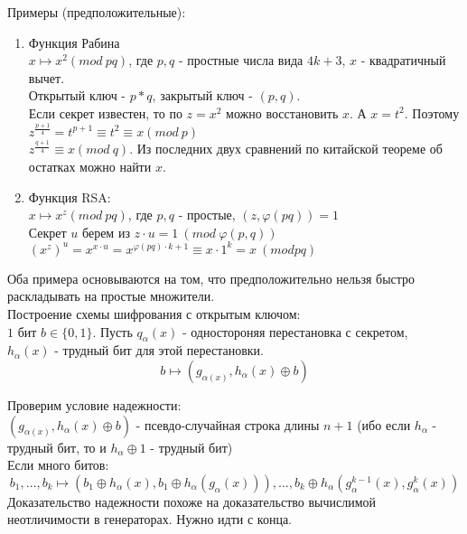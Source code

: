 \documentclass[a4paper]{article}
\theoremstyle{definition}
\theoremstyle{plain}
\begin{document}
\noindent Примеры (предположительные):
\begin{enumerate}
	\item Функция Рабина~\\
		$x \mapsto x^2 (mod\ pq)$, где $p, q$ - простные числа вида $4k + 3$, $x$ - квадратичный вычет.~\\
		Открытый ключ - $p * q$, закрытый ключ - $(p, q)$.~\\
		Если секрет известен, то по $z = x^2$ можно восстановить $x$. А $x = t^2$. Поэтому
		$z^{\frac{p + 1}{4}} = t^{p + 1} \equiv t^2 \equiv x (mod\ p)$~\\
		$z^{\frac{q + 1}{4}} \equiv x (mod\ q)$. Из последних двух сравнений по
		китайской теореме об остатках можно найти $x$.
		
	\item Функция RSA:~\\
		$x \mapsto x^z (mod\ pq)$, где $p, q$ - простые, $(z, \varphi(pq)) = 1$~\\
		Секрет $u$ берем из $z\cdot u = 1\ (mod\ \varphi(p, q))$~\\
		$(x^z)^u = x^{x\cdot u} = x^{\varphi(pq)\cdot k + 1} \equiv x\cdot 1^k = x\ (mod pq)$
\end{enumerate}

\noindent Оба примера основываются на том, что предположительно нельзя быстро раскладывать
на простые множители.~\\

\noindent Построение схемы шифрования с открытым ключом:~\\
$1$ бит $b \in \{0, 1\}$. Пусть $q_{\alpha}(x)$ - одностороняя перестановка с секретом,~\\
$h_{\alpha}(x)$ - трудный бит для этой перестановки.
$$
	b \mapsto (g_{\alpha(x)}, h_{\alpha}(x) \oplus b)
$$

\noindent Проверим условие надежности:~\\
$(g_{\alpha(x)}, h_{\alpha}(x) \oplus b)$ - псевдо-случайная строка длины $n + 1$ (ибо если $h_{\alpha}$ - трудный бит, то и $h_{\alpha} \oplus 1$ - трудный бит)~\\
Если много битов:~\\
$$
	b_1, \ldots, b_k \mapsto (b_1 \oplus h_{\alpha}(x), b_1 \oplus h_{\alpha}(g_{\alpha}(x))), \ldots, b_k \oplus h_{\alpha}(g_{\alpha}^{k - 1}(x), g_{\alpha}^k(x))
$$
Доказательство надежности похоже на доказательство вычислимой неотличимости в генераторах.
Нужно идти с конца.
\end{document}
